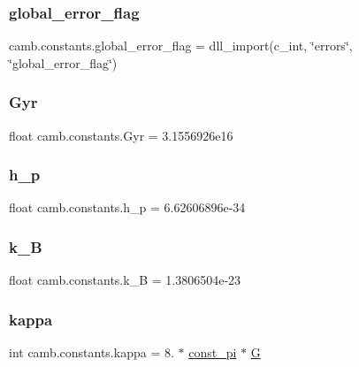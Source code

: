 \subsubsection{\texorpdfstring{global\+\_\+error\+\_\+flag}{global\_error\_flag}}
{\footnotesize\ttfamily camb.\+constants.\+global\+\_\+error\+\_\+flag = dll\+\_\+import(c\+\_\+int, \char`\"{}errors\char`\"{}, \char`\"{}global\+\_\+error\+\_\+flag\char`\"{})}

\mbox{\label{namespacecamb_1_1constants_ac84d257ae498484bfa842b31e8b3f049}} 
\subsubsection{\texorpdfstring{Gyr}{Gyr}}
{\footnotesize\ttfamily float camb.\+constants.\+Gyr = 3.\+1556926e16}

\mbox{\label{namespacecamb_1_1constants_ab268b921161c6a8a467bda8f21df3d17}} 
\subsubsection{\texorpdfstring{h\+\_\+p}{h\_p}}
{\footnotesize\ttfamily float camb.\+constants.\+h\+\_\+p = 6.\+62606896e-\/34}

\mbox{\label{namespacecamb_1_1constants_af524d81ee3b1617ff9509b924eae87cd}} 
\subsubsection{\texorpdfstring{k\+\_\+B}{k\_B}}
{\footnotesize\ttfamily float camb.\+constants.\+k\+\_\+B = 1.\+3806504e-\/23}

\mbox{\label{namespacecamb_1_1constants_ad820330cceb6ab8ae9fc124bc25bbd2f}} 
\subsubsection{\texorpdfstring{kappa}{kappa}}
{\footnotesize\ttfamily int camb.\+constants.\+kappa = 8. $\ast$ \mbox{\hyperlink{namespacecamb_1_1constants_a1020ead9e0e4db6bc81ad82aa777cd28}{const\+\_\+pi}} $\ast$ \mbox{\hyperlink{namespacecamb_1_1constants_a8ecaeb4a72719c13ff41d52253539559}{G}}}

